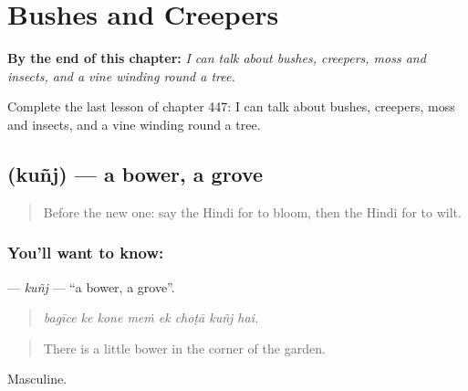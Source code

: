 
\chapter{Bushes and Creepers}
\label{ch:hi-bushes-and-creepers}

\begin{chapteropening}
\textbf{By the end of this chapter:} \emph{I can talk about bushes, creepers, moss and insects, and a vine winding round a tree.}

Complete the last lesson of chapter 447: I can talk about bushes, creepers, moss and insects, and a vine winding round a tree.
\end{chapteropening}

\section[\texorpdfstring{\hi{कुंज} (kuñj)}{कुंज (kuñj)}]{ (kuñj) — a bower, a grove}

\label{lesson:HI-C447-kunj}



\begin{quote}
Before the new one: say the Hindi for to bloom, then the Hindi for to wilt.
\end{quote}

\subsection*{You'll want to know: }
\textbf{} — \emph{kuñj} — \textquotedblleft{}a bower, a grove\textquotedblright{}.

\begin{quote}
       
\end{quote}

\begin{quote}
\emph{bagīce ke kone meṁ ek choṭā kuñj hai.}
\end{quote}

\begin{quote}
There is a little bower in the corner of the garden.
\end{quote}

Masculine.


